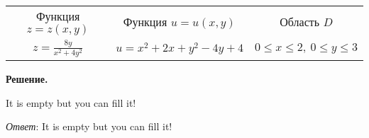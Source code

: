 \begin{enumerate}[label=\Alph*.]
    \vspace{5mm}

    \begin{tabular}{ccc}
        Функция $z = z(x, y)$                     & Функция $u = u(x, y)$         & Область $D$                          \\
        $\displaystyle z = \frac{8y}{x^2 + 4y^2}$ & $u = x^2 + 2x + y^2 - 4y + 4$ & $0 \leq x \leq 2, \ 0 \leq y \leq 3$
    \end{tabular}
\end{enumerate}

\vspace{10mm}
\textbf{Решение.}

It is empty but you can fill it!

\textit{Ответ}: It is empty but you can fill it!
\clearpage
